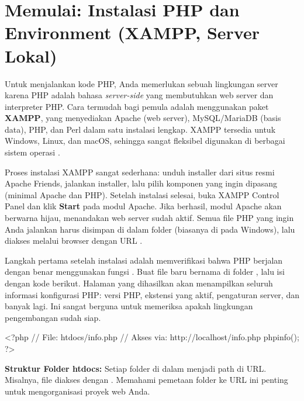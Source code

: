 ﻿\section[Memulai: Instalasi PHP dan Environment]{Memulai: Instalasi PHP dan Environment (XAMPP, Server Lokal)}

Untuk menjalankan kode PHP, Anda memerlukan sebuah lingkungan server karena PHP adalah bahasa \textit{server-side} yang membutuhkan web server dan interpreter PHP. Cara termudah bagi pemula adalah menggunakan paket \textbf{XAMPP}, yang menyediakan Apache (web server), MySQL/MariaDB (basis data), PHP, dan Perl dalam satu instalasi lengkap. XAMPP tersedia untuk Windows, Linux, dan macOS, sehingga sangat fleksibel digunakan di berbagai sistem operasi \cite{phpManual}.

Proses instalasi XAMPP sangat sederhana: unduh installer dari situs resmi Apache Friends, jalankan installer, lalu pilih komponen yang ingin dipasang (minimal Apache dan PHP). Setelah instalasi selesai, buka XAMPP Control Panel dan klik \textbf{Start} pada modul Apache. Jika berhasil, modul Apache akan berwarna hijau, menandakan web server sudah aktif. Semua file PHP yang ingin Anda jalankan harus disimpan di dalam folder  (biasanya di  pada Windows), lalu diakses melalui browser dengan URL  \cite{w3schoolsPhp}.

Langkah pertama setelah instalasi adalah memverifikasi bahwa PHP berjalan dengan benar menggunakan fungsi . Buat file baru bernama  di folder , lalu isi dengan kode berikut. Halaman yang dihasilkan akan menampilkan seluruh informasi konfigurasi PHP: versi PHP, ekstensi yang aktif, pengaturan server, dan banyak lagi. Ini sangat berguna untuk memeriksa apakah lingkungan pengembangan sudah siap.

\begin{webcode}[language=PHP, caption={Mengecek instalasi PHP dengan phpinfo()}]
<?php
// File: htdocs/info.php
// Akses via: http://localhost/info.php
phpinfo();
?>
\end{webcode}

\begin{konsep}
\textbf{Struktur Folder htdocs:} Setiap folder di dalam  menjadi path di URL. Misalnya, file  diakses dengan . Memahami pemetaan folder ke URL ini penting untuk mengorganisasi proyek web Anda.
\end{konsep}

